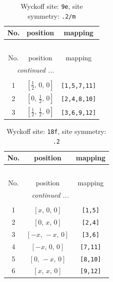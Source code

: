 \documentclass[fleqn,8pt]{jsarticle}
\begin{document}
\begin{longtable}{ccc}
\caption{Wyckoff site: {\tt 9e}, site symmetry: {\tt .2/m}}
 \\
 \hline \hline
No. & position & mapping \\ \hline \endfirsthead

\multicolumn{2}{l}{\tablename\ \thetable{}} \\
 \hline \hline
No. & position & mapping \\ \hline \endhead

 \hline \hline
\multicolumn{2}{r}{\footnotesize\it continued ...} \\ \endfoot

 \hline \hline
\multicolumn{2}{r}{} \\ \endlastfoot

1 & $\left[ \frac{1}{2},\, 0,\, 0 \right]$ & {\tt [1,5,7,11]} \\ \hline
2 & $\left[ 0,\, \frac{1}{2},\, 0 \right]$ & {\tt [2,4,8,10]} \\ \hline
3 & $\left[ \frac{1}{2},\, \frac{1}{2},\, 0 \right]$ & {\tt [3,6,9,12]} \\
\end{longtable}
\renewcommand{\arraystretch}{1.2}
\begin{longtable}{ccc}
\caption{Wyckoff site: {\tt 18f}, site symmetry: {\tt .2}}
 \\
 \hline \hline
No. & position & mapping \\ \hline \endfirsthead

\multicolumn{2}{l}{\tablename\ \thetable{}} \\
 \hline \hline
No. & position & mapping \\ \hline \endhead

 \hline \hline
\multicolumn{2}{r}{\footnotesize\it continued ...} \\ \endfoot

 \hline \hline
\multicolumn{2}{r}{} \\ \endlastfoot

1 & $\left[ x,\, 0,\, 0 \right]$ & {\tt [1,5]} \\ \hline
2 & $\left[ 0,\, x,\, 0 \right]$ & {\tt [2,4]} \\ \hline
3 & $\left[ - x,\, - x,\, 0 \right]$ & {\tt [3,6]} \\ \hline
4 & $\left[ - x,\, 0,\, 0 \right]$ & {\tt [7,11]} \\ \hline
5 & $\left[ 0,\, - x,\, 0 \right]$ & {\tt [8,10]} \\ \hline
6 & $\left[ x,\, x,\, 0 \right]$ & {\tt [9,12]} \\
\end{longtable}
\end{document}
